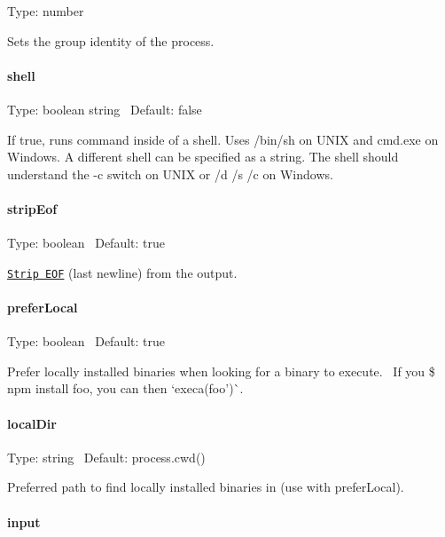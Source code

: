 Type\+: {\ttfamily number}

Sets the group identity of the process.

\paragraph*{shell}

Type\+: {\ttfamily boolean} {\ttfamily string}~\newline
 Default\+: {\ttfamily false}

If {\ttfamily true}, runs {\ttfamily command} inside of a shell. Uses {\ttfamily /bin/sh} on U\+N\+IX and {\ttfamily cmd.\+exe} on Windows. A different shell can be specified as a string. The shell should understand the {\ttfamily -\/c} switch on U\+N\+IX or {\ttfamily /d /s /c} on Windows.

\paragraph*{strip\+Eof}

Type\+: {\ttfamily boolean}~\newline
 Default\+: {\ttfamily true}

\href{https://github.com/sindresorhus/strip-eof}{\tt Strip E\+OF} (last newline) from the output.

\paragraph*{prefer\+Local}

Type\+: {\ttfamily boolean}~\newline
 Default\+: {\ttfamily true}

Prefer locally installed binaries when looking for a binary to execute.~\newline
 If you {\ttfamily \$ npm install foo}, you can then `execa(\textquotesingle{}foo')\`{}.

\paragraph*{local\+Dir}

Type\+: {\ttfamily string}~\newline
 Default\+: {\ttfamily process.\+cwd()}

Preferred path to find locally installed binaries in (use with {\ttfamily prefer\+Local}).

\paragraph*{input}


